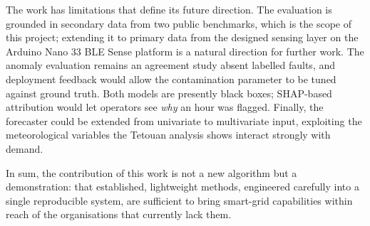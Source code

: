 \documentclass[conference]{IEEEtran}
\begin{document}
The work has limitations that define its future direction. The evaluation is
grounded in secondary data from two public benchmarks, which is the scope of
this project; extending it to primary data from the designed sensing layer on
the Arduino Nano 33 BLE Sense platform is a natural direction for further work.
The anomaly evaluation remains an agreement study absent labelled faults, and
deployment feedback would allow the contamination parameter to be tuned against
ground truth. Both models are presently black boxes; SHAP-based attribution
\cite{lundberg2017unified} would let operators see \emph{why} an hour was
flagged. Finally, the forecaster could be extended from univariate to
multivariate input, exploiting the meteorological variables the Tetouan
analysis shows interact strongly with demand.

In sum, the contribution of this work is not a new algorithm but a
demonstration: that established, lightweight methods, engineered carefully into
a single reproducible system, are sufficient to bring smart-grid capabilities
within reach of the organisations that currently lack them.



\end{document}
